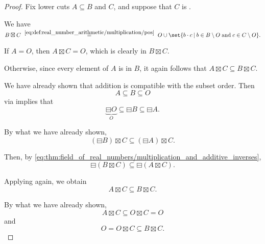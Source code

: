 \begin{proof}
  Fix lower cuts \( A \subseteq B \) and \( C \), and suppose that \( C \) is .

   We have
  \begin{equation*}
    B \boxtimes C
    \reloset {\eqref{eq:def:real_number_arithmetic/multiplication/pos}} =
    O \cup \set{ b \cdot c \given b \in B \setminus O \T{and} c \in C \setminus O }.
  \end{equation*}

  If \( A = O \), then \( A \boxtimes C = O \), which is clearly in \( B \boxtimes C \).

  Otherwise, since every element of \( A \) is in \( B \), it again follows that \( A \boxtimes C \subseteq B \boxtimes C \).

   We have already shown that addition is compatible with the subset order. Then
  \begin{equation*}
    A \subseteq B \subseteq O
  \end{equation*}
  via  implies that
  \begin{equation*}
    \underbrace{\boxminus O}_O \subseteq \boxminus B \subseteq \boxminus A.
  \end{equation*}

  By what we have already shown,
  \begin{equation*}
    (\boxminus B) \boxtimes C \subseteq (\boxminus A) \boxtimes C.
  \end{equation*}

  Then, by \eqref{eq:thm:field_of_real_numbers/multiplication_and_additive_inverses},
  \begin{equation*}
    \boxminus (B \boxtimes C) \subseteq \boxminus (A \boxtimes C).
  \end{equation*}

  Applying  again, we obtain
  \begin{equation*}
    A \boxtimes C \subseteq B \boxtimes C.
  \end{equation*}

   By what we have already shown,
  \begin{equation*}
    A \boxtimes C \subseteq O \boxtimes C = O
  \end{equation*}
  and
  \begin{equation*}
    O = O \boxtimes C \subseteq B \boxtimes C.
  \end{equation*}


\end{proof}
